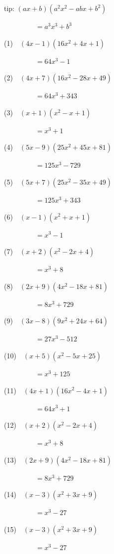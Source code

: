 \documentclass[a4j,twocolumn,10pt,fleqn]{jarticle}
\begin{document}
tip: $\left(a x + b\right) \left(a^{2} x^{2} - a b x + b^{2}\right)$

~~~~~~~~~$=a^{3} x^{3} + b^{3}$


(1)~~$\left(4 x - 1\right) \left(16 x^{2} + 4 x + 1\right)$

~~~~~~~~~$=64 x^{3} - 1$

(2)~~$\left(4 x + 7\right) \left(16 x^{2} - 28 x + 49\right)$

~~~~~~~~~$=64 x^{3} + 343$

(3)~~$\left(x + 1\right) \left(x^{2} - x + 1\right)$

~~~~~~~~~$=x^{3} + 1$

(4)~~$\left(5 x - 9\right) \left(25 x^{2} + 45 x + 81\right)$

~~~~~~~~~$=125 x^{3} - 729$

(5)~~$\left(5 x + 7\right) \left(25 x^{2} - 35 x + 49\right)$

~~~~~~~~~$=125 x^{3} + 343$

(6)~~$\left(x - 1\right) \left(x^{2} + x + 1\right)$

~~~~~~~~~$=x^{3} - 1$

(7)~~$\left(x + 2\right) \left(x^{2} - 2 x + 4\right)$

~~~~~~~~~$=x^{3} + 8$

(8)~~$\left(2 x + 9\right) \left(4 x^{2} - 18 x + 81\right)$

~~~~~~~~~$=8 x^{3} + 729$

(9)~~$\left(3 x - 8\right) \left(9 x^{2} + 24 x + 64\right)$

~~~~~~~~~$=27 x^{3} - 512$

(10)~~$\left(x + 5\right) \left(x^{2} - 5 x + 25\right)$

~~~~~~~~~$=x^{3} + 125$

(11)~~$\left(4 x + 1\right) \left(16 x^{2} - 4 x + 1\right)$

~~~~~~~~~$=64 x^{3} + 1$

(12)~~$\left(x + 2\right) \left(x^{2} - 2 x + 4\right)$

~~~~~~~~~$=x^{3} + 8$

(13)~~$\left(2 x + 9\right) \left(4 x^{2} - 18 x + 81\right)$

~~~~~~~~~$=8 x^{3} + 729$

(14)~~$\left(x - 3\right) \left(x^{2} + 3 x + 9\right)$

~~~~~~~~~$=x^{3} - 27$

(15)~~$\left(x - 3\right) \left(x^{2} + 3 x + 9\right)$

~~~~~~~~~$=x^{3} - 27$
\end{document}
